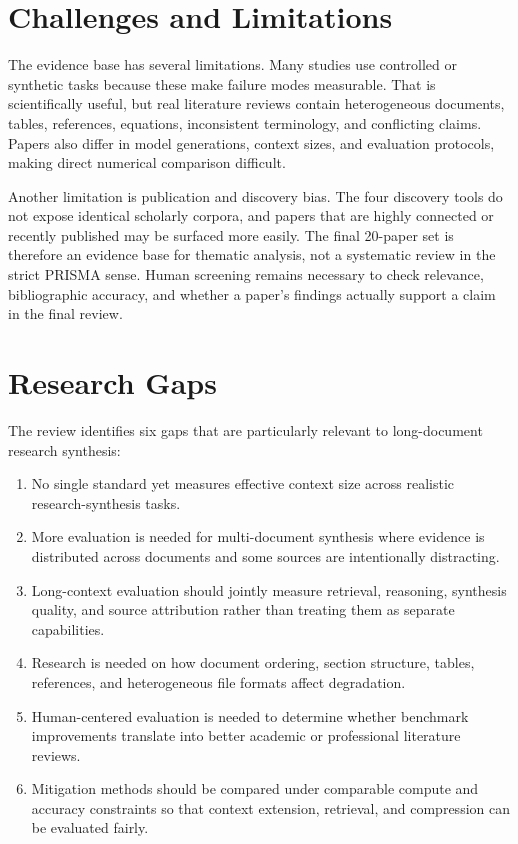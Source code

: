 \documentclass[manuscript,screen,oneside]{acmart}
\begin{document}
\section{Challenges and Limitations}\label{sec:limitations}
The evidence base has several limitations. Many studies use controlled or synthetic tasks because these make failure modes measurable. That is scientifically useful, but real literature reviews contain heterogeneous documents, tables, references, equations, inconsistent terminology, and conflicting claims. Papers also differ in model generations, context sizes, and evaluation protocols, making direct numerical comparison difficult.

Another limitation is publication and discovery bias. The four discovery tools do not expose identical scholarly corpora, and papers that are highly connected or recently published may be surfaced more easily. The final 20-paper set is therefore an evidence base for thematic analysis, not a systematic review in the strict PRISMA sense. Human screening remains necessary to check relevance, bibliographic accuracy, and whether a paper's findings actually support a claim in the final review.

\section{Research Gaps}\label{sec:gaps}
The review identifies six gaps that are particularly relevant to long-document research synthesis:
\begin{enumerate}
\item No single standard yet measures effective context size across realistic research-synthesis tasks.
\item More evaluation is needed for multi-document synthesis where evidence is distributed across documents and some sources are intentionally distracting.
\item Long-context evaluation should jointly measure retrieval, reasoning, synthesis quality, and source attribution rather than treating them as separate capabilities.
\item Research is needed on how document ordering, section structure, tables, references, and heterogeneous file formats affect degradation.
\item Human-centered evaluation is needed to determine whether benchmark improvements translate into better academic or professional literature reviews.
\item Mitigation methods should be compared under comparable compute and accuracy constraints so that context extension, retrieval, and compression can be evaluated fairly.
\end{enumerate}
\end{document}
